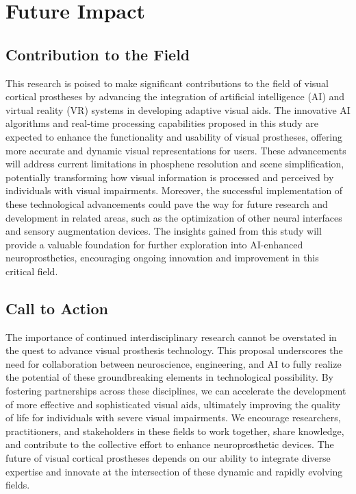 \documentclass[10pt]{article}
\begin{document}
\section*{Future Impact}\label{sec:impact}
\subsection*{Contribution to the Field}
This research is poised to make significant contributions to the field of visual
cortical prostheses by advancing the integration of artificial intelligence (AI)
and virtual reality (VR) systems in developing adaptive visual aids. The
innovative AI algorithms and real-time processing capabilities proposed in this
study are expected to enhance the functionality and usability of visual
prostheses, offering more accurate and dynamic visual representations for users.
These advancements will address current limitations in phosphene resolution and
scene simplification, potentially transforming how visual information is
processed and perceived by individuals with visual impairments. Moreover, the
successful implementation of these technological advancements could pave the way
for future research and development in related areas, such as the optimization
of other neural interfaces and sensory augmentation devices. The insights gained
from this study will provide a valuable foundation for further exploration into
AI-enhanced neuroprosthetics, encouraging ongoing innovation and improvement in
this critical field.

\subsection*{Call to Action}
The importance of continued interdisciplinary research cannot be overstated in
the quest to advance visual prosthesis technology. This proposal underscores the
need for collaboration between neuroscience, engineering, and AI to fully
realize the potential of these groundbreaking elements in technological
possibility. By fostering partnerships across these disciplines, we can
accelerate the development of more effective and sophisticated visual aids,
ultimately improving the quality of life for individuals with severe visual
impairments. We encourage researchers, practitioners, and stakeholders in these
fields to work together, share knowledge, and contribute to the collective
effort to enhance neuroprosthetic devices. The future of visual cortical
prostheses depends on our ability to integrate diverse expertise and innovate at
the intersection of these dynamic and rapidly evolving fields.
\clearpage
\end{document}
